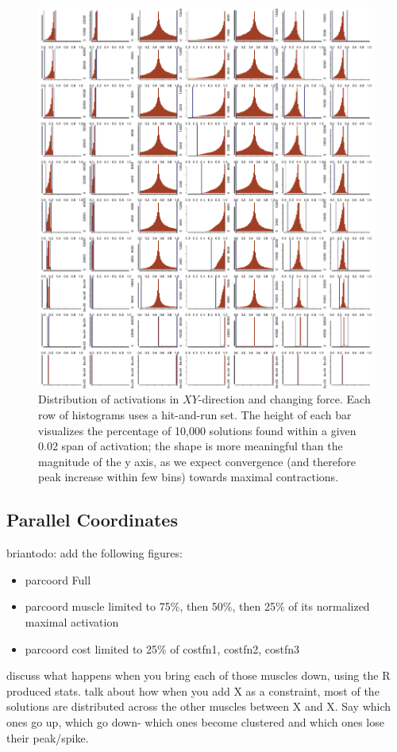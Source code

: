 \begin{figure}[htbp]
\centering
\includegraphics[width=\textwidth]{figs/XY_alphaProgression.pdf}
\caption{Distribution of activations in $XY$-direction and changing force. Each row of histograms uses a hit-and-run set. The height of each bar visualizes the percentage of 10,000 solutions found within a given 0.02 span of activation; the shape is more meaningful than the magnitude of the y axis, as we expect convergence (and therefore peak increase within few bins) towards maximal contractions.}
\label{fig:XY_progression}
\end{figure}

\subsection{Parallel Coordinates} %
\label{sub:parallel_coordinates}
briantodo: add the following figures:
\begin{itemize}
	\item{parcoord Full}
	\item{parcoord muscle limited to 75\%, then 50\%, then 25\% of its normalized maximal activation}
	\item{parcoord cost limited to 25\% of costfn1, costfn2, costfn3}
\end{itemize}

discuss what happens when you bring each of those muscles down, using the R produced stats.
talk about how when you add X as a constraint, most of the solutions are distributed across the other muscles between X and X. Say which ones go up, which go down- which ones become clustered and which ones lose their peak/spike.

